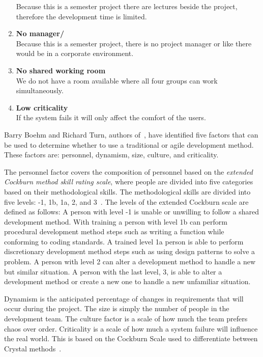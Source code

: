 \begin{enumerate}
	Because this is a semester project there are lectures beside the project, therefore the development time is limited. 
	\item \textbf{No manager/\productowner{}} \label{enum:manager}\\
	Because this is a semester project, there is no project manager or \productowner{} like there would be in a corporate environment.
	\item \textbf{No shared working room} \label{enum:room}\\
	We do not have a room available where all four groups can work simultaneously.
	\item \textbf{Low criticality} \label{enum:criticality}\\
	If the system fails it will only affect the comfort of the users.
\end{enumerate}
Barry Boehm and Richard Turn, authors of~\citep{boehmTurner}, have identified five factors that can be used to determine whether to use a traditional or agile development method.
These factors are: personnel, dynamism, size, culture, and criticality.

The personnel factor covers the composition of personnel based on the \textit{extended Cockburn method skill rating scale}, where people are divided into five categories based on their methodological skills.
The methodological skills are divided into five levels: -1, 1b, 1a, 2, and 3~\cite[p.~34]{boehmTurner}.
The levels of the extended Cockburn scale are defined as follows:
A person with level -1 is unable or unwilling to follow a shared development method.
With training a person with level 1b can perform procedural development method steps such as writing a function while conforming to coding standards.
A trained level 1a person is able to perform discretionary development method steps such as using design patterns to solve a problem.
A person with level 2 can alter a development method to handle a new but similar situation.
A person with the last level, 3, is able to alter a development method or create a new one to handle a new unfamiliar situation.

Dynamism is the anticipated percentage of changes in requirements that will occur during the project.
The size is simply the number of people in the development team.
The culture factor is a scale of how much the team prefers chaos over order.
Criticality is a scale of how much a system failure will influence the real world.
This is based on the Cockburn Scale used to differentiate between Crystal methods~\cite[pp.~36-37]{Larman04}.


